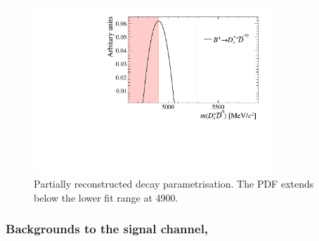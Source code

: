 \begin{figure}[!h]
    \centering
    \includegraphics[width=0.80\textwidth]{figs/B2DsPhi/DsstarDstar0_part_reco_Shapes.pdf}
    \caption{Partially reconstructed \decay{\Bp}{\Dssp\Dstarzb} decay parametrisation. The PDF extends below the lower fit range at 4900\mevcc.}
    \label{fig:B2DsPhi_DsstarDstar0_partreco}   
\end{figure}



\subsubsection{Backgrounds to the signal channel, \decay{\Bp}{\Dsp\phiz}}




